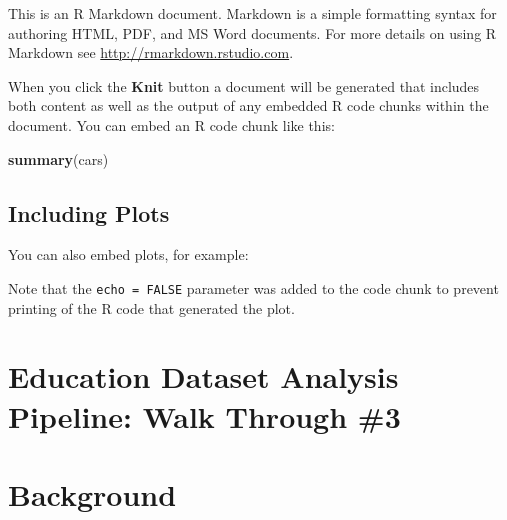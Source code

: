 \documentclass[]{book}
\newenvironment{Shaded}{\begin{snugshade}}{\end{snugshade}}
\newcommand{\KeywordTok}[1]{\textcolor[rgb]{0.13,0.29,0.53}{\textbf{#1}}}
\newcommand{\DataTypeTok}[1]{\textcolor[rgb]{0.13,0.29,0.53}{#1}}
\newcommand{\DecValTok}[1]{\textcolor[rgb]{0.00,0.00,0.81}{#1}}
\newcommand{\StringTok}[1]{\textcolor[rgb]{0.31,0.60,0.02}{#1}}
\newcommand{\CommentTok}[1]{\textcolor[rgb]{0.56,0.35,0.01}{\textit{#1}}}
\newcommand{\OtherTok}[1]{\textcolor[rgb]{0.56,0.35,0.01}{#1}}
\newcommand{\OperatorTok}[1]{\textcolor[rgb]{0.81,0.36,0.00}{\textbf{#1}}}
\newcommand{\NormalTok}[1]{#1}
\begin{document}
This is an R Markdown document. Markdown is a simple formatting syntax
for authoring HTML, PDF, and MS Word documents. For more details on
using R Markdown see \url{http://rmarkdown.rstudio.com}.

When you click the \textbf{Knit} button a document will be generated
that includes both content as well as the output of any embedded R code
chunks within the document. You can embed an R code chunk like this:

\begin{Shaded}
\begin{Highlighting}[]
\KeywordTok{summary}\NormalTok{(cars)}
\end{Highlighting}
\end{Shaded}

\section{Including Plots}\label{including-plots}

You can also embed plots, for example:

Note that the \texttt{echo\ =\ FALSE} parameter was added to the code
chunk to prevent printing of the R code that generated the plot.

\chapter{Education Dataset Analysis Pipeline: Walk Through
\#3}\label{education-dataset-analysis-pipeline-walk-through-3}

\begin{Shaded}
\end{Shaded}

\chapter{Background}\label{background-1}
\end{document}

